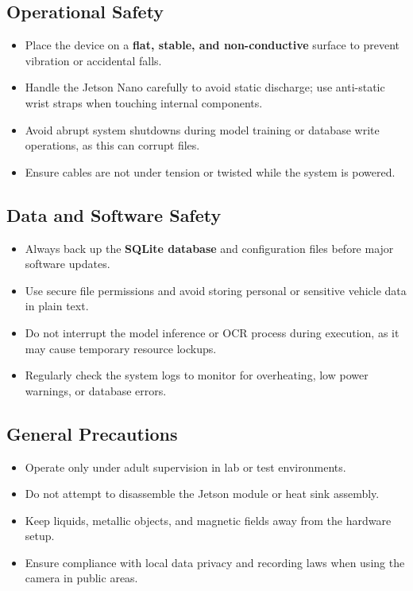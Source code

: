 \subsection{Operational Safety}
\begin{itemize}
	\item Place the device on a \textbf{flat, stable, and non-conductive} surface to prevent vibration or accidental falls.
	\item Handle the Jetson Nano carefully to avoid static discharge; use anti-static wrist straps when touching internal components.
	\item Avoid abrupt system shutdowns during model training or database write operations, as this can corrupt files.
	\item Ensure cables are not under tension or twisted while the system is powered.
\end{itemize}

\subsection{Data and Software Safety}
\begin{itemize}
	\item Always back up the \textbf{SQLite database} and configuration files before major software updates.
	\item Use secure file permissions and avoid storing personal or sensitive vehicle data in plain text.
	\item Do not interrupt the model inference or OCR process during execution, as it may cause temporary resource lockups.
	\item Regularly check the system logs to monitor for overheating, low power warnings, or database errors.
\end{itemize}

\subsection{General Precautions}
\begin{itemize}
	\item Operate only under adult supervision in lab or test environments.
	\item Do not attempt to disassemble the Jetson module or heat sink assembly.
	\item Keep liquids, metallic objects, and magnetic fields away from the hardware setup.
	\item Ensure compliance with local data privacy and recording laws when using the camera in public areas.
\end{itemize}

